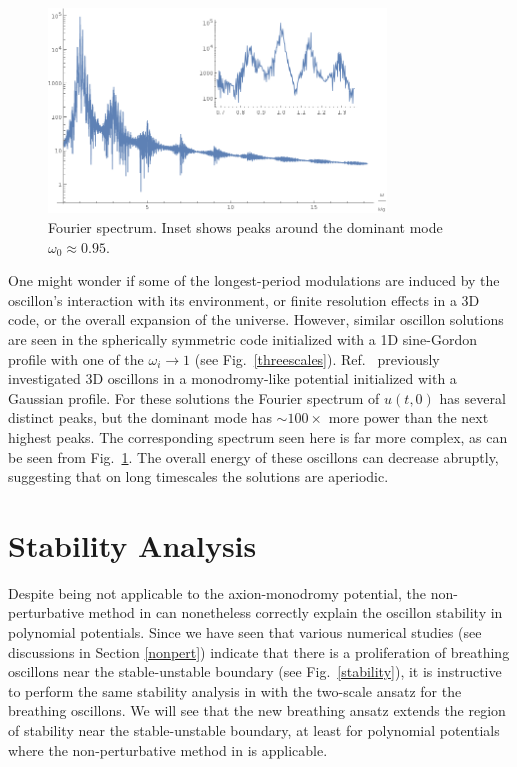 \documentclass{report}
\begin{document}
\begin{figure}
  \centering
  \includegraphics[width=0.8\textwidth]{plot/fourier.png}
  \caption{Fourier spectrum. Inset shows peaks around the dominant mode $\omega_0\approx0.95$.}\label{fourier}
\end{figure}

One might wonder if some of the longest-period modulations are induced by the oscillon's interaction with its environment, or finite resolution effects in a 3D code, or the overall expansion of the universe. However, similar oscillon solutions are seen in the spherically symmetric code initialized with a 1D sine-Gordon profile with one of the $\omega_i\to1$ (see Fig.~\ref{threescales}). Ref.~\cite{Salmi:2012ta} previously investigated 3D oscillons in a monodromy-like potential initialized with a Gaussian profile. For these solutions the Fourier spectrum of $u(t,0)$ has several distinct peaks, but the dominant mode has $\sim 100\times$ more power than the next highest peaks. The corresponding spectrum seen here is far more complex,  as can be seen from  Fig.~\ref{fourier}. The overall energy of these oscillons can decrease abruptly, suggesting that on long timescales the solutions are aperiodic.

\chapter{Stability Analysis}

Despite being not applicable to the axion-monodromy potential, the non-pertur\-bative method in \cite{PhysRevD.80.125037, Gleiser:2008ty} can nonetheless correctly explain the oscillon stability in polynomial potentials. Since we have seen that various numerical studies (see discussions in Section \ref{nonpert}) indicate that there is a proliferation of breathing oscillons near the stable-unstable boundary (see Fig.~\ref{stability}), it is instructive to perform the same stability analysis in \cite{PhysRevD.80.125037, Gleiser:2008ty} with the two-scale ansatz for the breathing oscillons. We will see that the new breathing ansatz extends the region of stability near the stable-unstable boundary, at least for polynomial potentials where the non-perturbative method in \cite{PhysRevD.80.125037, Gleiser:2008ty} is applicable.
\end{document}
